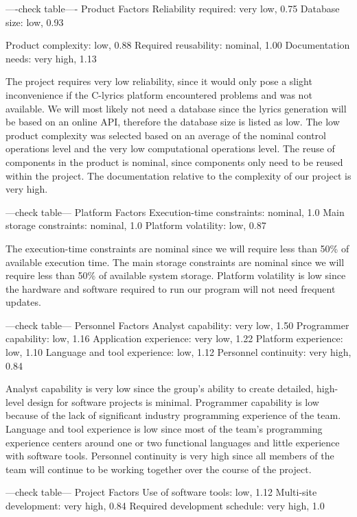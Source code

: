 \documentclass[]{article}
\begin{document}
----check table---- Product Factors Reliability required: very low, 0.75
Database size: low, 0.93

Product complexity: low, 0.88 Required reusability: nominal, 1.00
Documentation needs: very high, 1.13

The project requires very low reliability, since it would only pose a
slight inconvenience if the C-lyrics platform encountered problems and
was not available. We will most likely not need a database since the
lyrics generation will be based on an online API, therefore the database
size is listed as low. The low product complexity was selected based on
an average of the nominal control operations level and the very low
computational operations level. The reuse of components in the product
is nominal, since components only need to be reused within the project.
The documentation relative to the complexity of our project is very
high.

---check table--- Platform Factors Execution-time constraints: nominal,
1.0 Main storage constraints: nominal, 1.0 Platform volatility: low,
0.87

The execution-time constraints are nominal since we will require less
than 50\% of available execution time. The main storage constraints are
nominal since we will require less than 50\% of available system
storage. Platform volatility is low since the hardware and software
required to run our program will not need frequent updates.

---check table--- Personnel Factors Analyst capability: very low, 1.50
Programmer capability: low, 1.16 Application experience: very low, 1.22
Platform experience: low, 1.10 Language and tool experience: low, 1.12
Personnel continuity: very high, 0.84

Analyst capability is very low since the group's ability to create
detailed, high-level design for software projects is minimal. Programmer
capability is low because of the lack of significant industry
programming experience of the team. Language and tool experience is low
since most of the team's programming experience centers around one or
two functional languages and little experience with software tools.
Personnel continuity is very high since all members of the team will
continue to be working together over the course of the project.

---check table--- Project Factors Use of software tools: low, 1.12
Multi-site development: very high, 0.84 Required development schedule:
very high, 1.0
\end{document}

